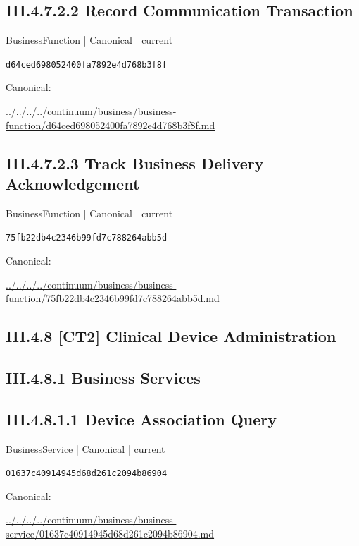 \documentclass[10pt,a4paper]{article}
\begin{document}
\subsection*{III.4.7.2.2 Record Communication Transaction}
{\small BusinessFunction | Canonical | current}\par
\texttt{d64ced698052400fa7892e4d768b3f8f}\par
Canonical: \par
{\footnotesize\url{../../../../continuum/business/business-function/d64ced698052400fa7892e4d768b3f8f.md}}\par
\subsection*{III.4.7.2.3 Track Business Delivery Acknowledgement}
{\small BusinessFunction | Canonical | current}\par
\texttt{75fb22db4c2346b99fd7c788264abb5d}\par
Canonical: \par
{\footnotesize\url{../../../../continuum/business/business-function/75fb22db4c2346b99fd7c788264abb5d.md}}\par
\subsection*{III.4.8 [CT2] Clinical Device Administration}
\subsection*{III.4.8.1 Business Services}
\subsection*{III.4.8.1.1 Device Association Query}
{\small BusinessService | Canonical | current}\par
\texttt{01637c40914945d68d261c2094b86904}\par
Canonical: \par
{\footnotesize\url{../../../../continuum/business/business-service/01637c40914945d68d261c2094b86904.md}}\par
\end{document}
